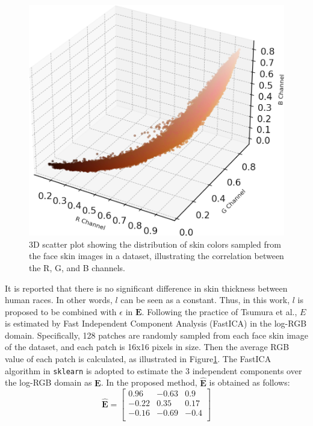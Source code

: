 \begin{spacing}{1.5}
\begin{figure}[t!]
    \centering
    \includegraphics{Chapter3/original_data_rounded_plot.png}
    \caption{3D scatter plot showing the distribution of skin colors sampled from the face skin images in a dataset, illustrating the correlation between the R, G, and B channels.}
    \label{fig:3dplot}
\end{figure}

It is reported that there is no significant difference in skin thickness between human races\cite{Whitmore2000}. In other words, $l$ can be seen as a constant. Thus, in this work, $l$ is proposed to be combined with $\epsilon$ in $\mathbf{E}$. Following the practice of Tsumura et al.\cite{tsumura1999independent}, $E$ is estimated by Fast Independent Component Analysis (FastICA)\cite{HYVARINEN2000411} in the log-RGB domain. Specifically, 128 patches are randomly sampled from each face skin image of the dataset, and each patch is 16x16 pixels in size. Then the average RGB value of each patch is calculated, as illustrated in Figure\ref{fig:3dplot}. The FastICA algorithm in \texttt{sklearn}\cite{scikit-learn} is adopted to estimate the 3 independent components over the log-RGB domain as $\mathbf{E}$. In the proposed method, $\hat{\mathbf{E}}$ is obtained as follows:
\begin{equation}
    \hat{\mathbf{E}} = \begin{bmatrix}
        0.96  & -0.63 & 0.9  \\
        -0.22 & 0.35  & 0.17 \\
        -0.16 & -0.69 & -0.4 \\
    \end{bmatrix}
\end{equation}


\end{spacing}
